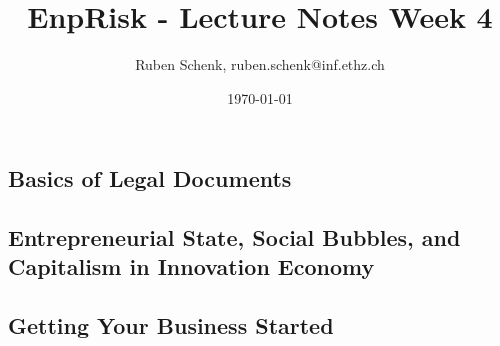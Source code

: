 \documentclass[a4paper]{extarticle}
\title{EnpRisk - Lecture Notes Week 4}
\author{Ruben Schenk, ruben.schenk@inf.ethz.ch}
\date{\today}
\begin{document}
\maketitle
\newpage

\subsection{Basics of Legal Documents}

\subsection{Entrepreneurial State, Social Bubbles, and Capitalism in Innovation Economy}

\subsection{Getting Your Business Started}
\end{document}
